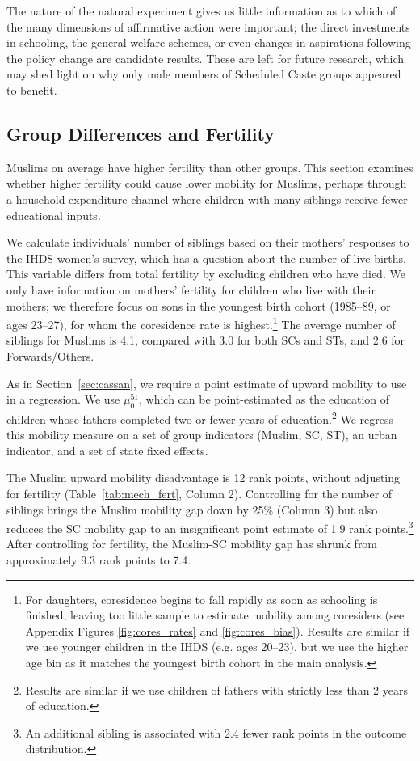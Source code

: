 \documentclass[12pt,letterpaper]{article}
\numberwithin{equation}{section}
\begin{document}
The nature of the natural experiment gives us little information as to which of the many dimensions of affirmative action were important; the direct investments in schooling, the general welfare schemes, or even changes in aspirations following the policy change are candidate results. These are left for future research, which may shed light on why only male members of Scheduled Caste groups appeared to benefit.

\subsection{Group Differences and Fertility}

Muslims on average have higher fertility than other groups. This section examines whether higher fertility could cause lower mobility for Muslims, perhaps through a household expenditure channel where children with many siblings receive fewer educational inputs.

We calculate individuals' number of siblings based on their mothers' responses to the IHDS women's survey, which has a question about the number of live births. This variable differs from total fertility by excluding children who have died. We only have information on mothers' fertility for children who live with their mothers; we therefore focus on sons in the youngest birth cohort (1985--89, or ages 23--27), for whom the coresidence rate is highest.\footnote{For daughters, coresidence begins to fall rapidly as soon as schooling is finished, leaving too little sample to estimate mobility among coresiders (see Appendix Figures \ref{fig:cores_rates} and \ref{fig:cores_bias}). Results are similar if we use younger children in the IHDS (e.g. ages 20--23), but we use the higher age bin as it matches the youngest birth cohort in the main analysis.} The average number of siblings for Muslims is 4.1, compared with 3.0 for both SCs and STs, and 2.6 for Forwards/Others.

As in Section~\ref{sec:cassan}, we require a point estimate of upward mobility to use in a regression. We use $\mu_0^{51}$, which can be point-estimated as the education of children whose fathers completed two or fewer years of education.\footnote{Results are similar if we use children of fathers with strictly less than 2 years of education.} We regress this mobility measure on a set of group indicators (Muslim, SC, ST), an urban indicator, and a set of state fixed effects. 

The Muslim upward mobility disadvantage is 12 rank points, without adjusting for fertility (Table~\ref{tab:mech_fert}, Column 2). Controlling for the number of siblings brings the Muslim mobility gap down by 25\% (Column 3) but also reduces the SC mobility gap to an insignificant point estimate of 1.9 rank points.\footnote{An additional sibling is associated with 2.4 fewer rank points in the outcome distribution.} After controlling for fertility, the Muslim-SC mobility gap has shrunk from approximately 9.3 rank points to 7.4. 
\end{document}
